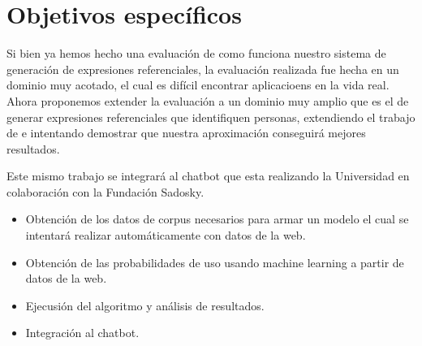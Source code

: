 \section{Objetivos espec\'ificos}
\label{objetivos}

Si bien ya hemos hecho una evaluaci\'on de como funciona nuestro sistema de generaci\'on de expresiones referenciales, la evaluaci\'on realizada 
fue hecha en un dominio muy acotado, el cual es dif\'icil encontrar aplicacioens en la vida real. Ahora proponemos
extender la evaluaci\'on a un dominio muy amplio que es el de generar expresiones referenciales que identifiquen personas, extendiendo el
trabajo de \cite{pacheco-duboue-dominguez:2012:NAACL-HLT} e intentando demostrar que nuestra aproximaci\'on conseguir\'a mejores resultados.

Este mismo trabajo se integrar\'a al chatbot que esta realizando la Universidad en colaboraci\'on con la Fundaci\'on Sadosky.
\begin{itemize}

\item Obtenci\'on de los datos de corpus necesarios para armar un modelo el cual se intentar\'a realizar autom\'aticamente con datos de la web.
\item Obtenci\'on de las probabilidades de uso usando machine learning a partir de datos de la web.
\item Ejecusi\'on del algoritmo y an\'alisis de resultados.
\item Integraci\'on al chatbot.
\end{itemize}
